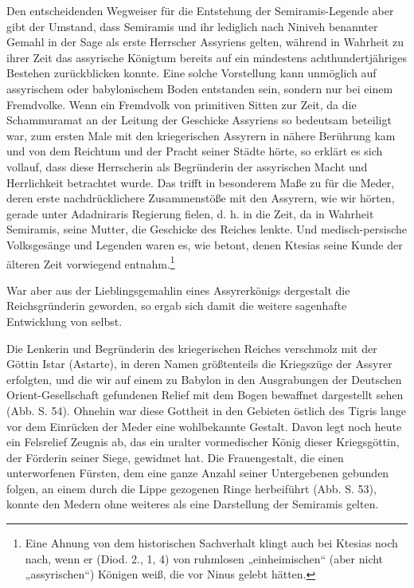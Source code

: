 \documentclass[a4paper, 11pt, oneside, polutonikogreek, german]{article}
\begin{document}
Den entscheidenden Wegweiser für die Entstehung der Semiramis-Legende aber gibt der Umstand, dass Semiramis und ihr lediglich nach Niniveh benannter Gemahl in der Sage als erste Herrscher Assyriens gelten, während in Wahrheit zu ihrer Zeit das assyrische Königtum bereits auf ein mindestens achthundertjähriges Bestehen zurückblicken konnte. Eine solche Vorstellung kann unmöglich auf assyrischem oder babylonischem Boden entstanden sein, sondern nur bei einem Fremdvolke. Wenn ein Fremdvolk von primitiven Sitten zur Zeit, da die Schammuramat an der Leitung der Geschicke Assyriens so bedeutsam beteiligt war, zum ersten Male mit den kriegerischen Assyrern in nähere Berührung kam und von dem Reichtum und der Pracht seiner Städte hörte, so erklärt es sich vollauf, dass diese Herrscherin als Begründerin der assyrischen Macht und Herrlichkeit betrachtet wurde. Das trifft in besonderem Maße zu für die Meder, deren erste nachdrücklichere Zusammenstöße mit den Assyrern, wie wir hörten, gerade unter Adadniraris Regierung fielen, d. h. in die Zeit, da in Wahrheit Semiramis, seine Mutter, die Geschicke des Reiches lenkte. Und medisch-persische Volksgesänge und Legenden waren es, wie betont, denen Ktesias seine Kunde der älteren Zeit vorwiegend entnahm.\footnote{Eine Ahnung von dem historischen Sachverhalt klingt auch bei Ktesias noch nach, wenn er (Diod. 2., 1, 4) von ruhmlosen „einheimischen“ (aber nicht „assyrischen“) Königen weiß, die vor Ninus gelebt hätten.}

War aber aus der Lieblingsgemahlin eines Assyrerkönigs dergestalt die Reichsgründerin geworden, so ergab sich damit die weitere sagenhafte Entwicklung von selbst.

Die Lenkerin und Begründerin des kriegerischen Reiches verschmolz mit der Göttin Istar (Astarte), in deren Namen größtenteils die Kriegszüge der Assyrer erfolgten, und die wir auf einem zu Babylon in den Ausgrabungen der Deutschen Orient-Gesellschaft gefundenen Relief mit dem Bogen bewaffnet dargestellt sehen (Abb. S. 54). Ohnehin war diese Gottheit in den Gebieten östlich des Tigris lange vor dem Einrücken der Meder eine wohlbekannte Gestalt. Davon legt noch heute ein Felsrelief Zeugnis ab, das ein uralter vormedischer König dieser Kriegsgöttin, der Förderin seiner Siege, gewidmet hat. Die Frauengestalt, die einen unterworfenen Fürsten, dem eine ganze Anzahl seiner Untergebenen gebunden folgen, an einem durch die Lippe gezogenen Ringe herbeiführt (Abb. S. 53), konnte den Medern ohne weiteres als eine Darstellung der Semiramis gelten.
\end{document}
